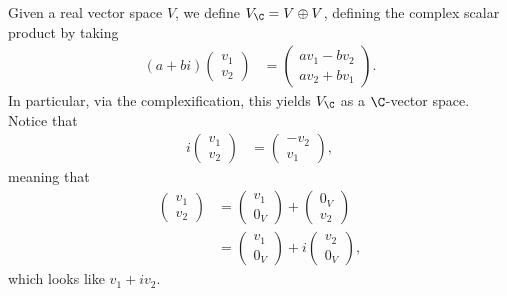 \documentclass[10pt]{mypackage}
\begin{document}
\begin{example}
Given a real vector space $V$, we define $V_{\C} = V\oplus V$, defining the complex scalar product by taking
\begin{align*}
  \left(a + bi\right) \begin{pmatrix}v_1\\v_2\end{pmatrix} &= \begin{pmatrix}av_1 - bv_2 \\ av_2 + bv_1\end{pmatrix}.
\end{align*}
In particular, via the complexification, this yields $V_{\C}$ as a $\C$-vector space. Notice that
\begin{align*}
  i \begin{pmatrix}v_1\\v_2\end{pmatrix} &= \begin{pmatrix}-v_2\\v_1\end{pmatrix},
\end{align*}
meaning that
\begin{align*}
  \begin{pmatrix}v_1\\v_2\end{pmatrix} &= \begin{pmatrix}v_1\\0_V\end{pmatrix} + \begin{pmatrix}0_V\\v_2\end{pmatrix}\\
                                       &=  \begin{pmatrix}v_1\\0_V\end{pmatrix} + i\begin{pmatrix}v_2\\0_V\end{pmatrix},
\end{align*}
which looks like $v_1 + iv_2$.\newline


\end{example}
\end{document}
